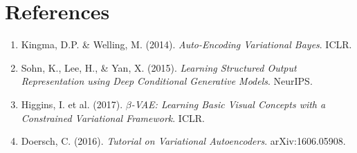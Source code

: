 \documentclass[11pt,a4paper]{article}
\begin{document}
\section{References}

\begin{enumerate}
    \item Kingma, D.P. \& Welling, M. (2014). \textit{Auto-Encoding Variational Bayes}. ICLR.
    \item Sohn, K., Lee, H., \& Yan, X. (2015). \textit{Learning Structured Output Representation using Deep Conditional Generative Models}. NeurIPS.
    \item Higgins, I. et al. (2017). \textit{$\beta$-VAE: Learning Basic Visual Concepts with a Constrained Variational Framework}. ICLR.
    \item Doersch, C. (2016). \textit{Tutorial on Variational Autoencoders}. arXiv:1606.05908.
\end{enumerate}
\end{document}
